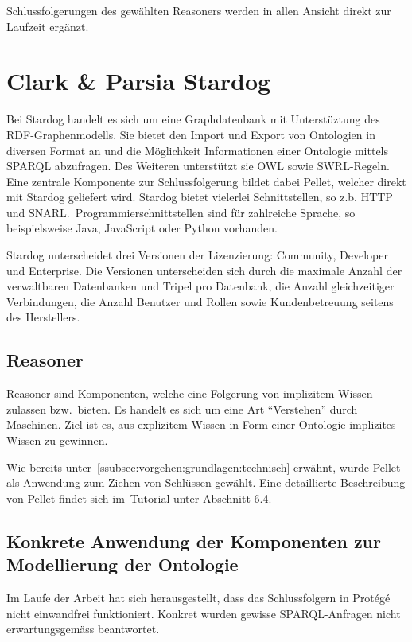 Schlussfolgerungen des gewählten Reasoners werden in allen Ansicht direkt zur Laufzeit ergänzt.

\section{Clark \& Parsia Stardog}
\label{sec:komponenten_stardog}
Bei Stardog handelt es sich um eine Graphdatenbank mit Unterstüztung des RDF-Graphenmodells. Sie bietet den Import und Export von Ontologien in diversen Format an und die Möglichkeit Informationen einer Ontologie mittels SPARQL abzufragen. Des Weiteren unterstützt sie OWL sowie SWRL-Regeln. Eine zentrale Komponente zur Schlussfolgerung bildet dabei Pellet, welcher direkt mit Stardog geliefert wird. Stardog bietet vielerlei Schnittstellen, so z.b. HTTP und SNARL.\ Programmierschnittstellen sind für zahlreiche Sprache, so beispielsweise Java, JavaScript oder Python vorhanden.~\cite{stardogDocu}

Stardog unterscheidet drei Versionen der Lizenzierung: Community, Developer und Enterprise. Die Versionen unterscheiden sich durch die maximale Anzahl der verwaltbaren Datenbanken und Tripel pro Datenbank, die Anzahl gleichzeitiger Verbindungen, die Anzahl Benutzer und Rollen sowie Kundenbetreuung seitens des Herstellers.~\cite{stardogDocu}

\subsection{Reasoner}
\label{subsec:komponenten_reasoner}
Reasoner sind Komponenten, welche eine Folgerung von implizitem Wissen zulassen bzw.\ bieten. Es handelt es sich um eine Art ``Verstehen'' durch Maschinen. Ziel ist es, aus explizitem Wissen in Form einer Ontologie implizites Wissen zu gewinnen.

Wie bereits unter~\autoref{ssubsec:vorgehen:grundlagen:technisch} erwähnt, wurde Pellet als Anwendung zum Ziehen von Schlüssen gewählt. Eine detaillierte Beschreibung von Pellet findet sich im~\hyperref[sec:anhang:tutorial_dokument]{Tutorial} unter Abschnitt 6.4.

\subsection{Konkrete Anwendung der Komponenten zur Modellierung der Ontologie}
\label{subsec:komponenten_anwendung}
Im Laufe der Arbeit hat sich herausgestellt, dass das Schlussfolgern in Protégé nicht einwandfrei funktioniert. Konkret wurden gewisse SPARQL-Anfragen nicht erwartungsgemäss beantwortet.

